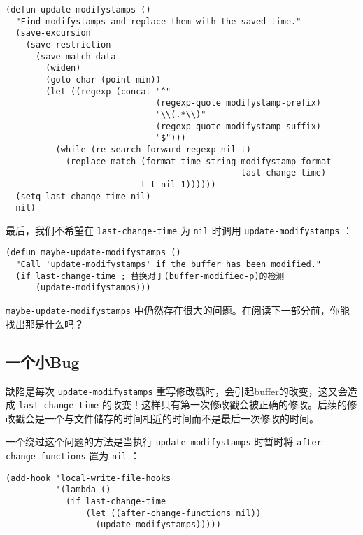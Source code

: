 \begin{verbatim}
(defun update-modifystamps ()
  "Find modifystamps and replace them with the saved time."
  (save-excursion
    (save-restriction
      (save-match-data
        (widen)
        (goto-char (point-min))
        (let ((regexp (concat "^"
                              (regexp-quote modifystamp-prefix)
                              "\\(.*\\)"
                              (regexp-quote modifystamp-suffix)
                              "$")))
          (while (re-search-forward regexp nil t)
            (replace-match (format-time-string modifystamp-format
                                               last-change-time)
                           t t nil 1))))))
  (setq last-change-time nil)
  nil)
\end{verbatim}

最后，我们不希望在 \texttt{last-change-time} 为 \texttt{nil} 时调用 \texttt{update-modifystamps} ：

\begin{verbatim}
(defun maybe-update-modifystamps ()
  "Call 'update-modifystamps' if the buffer has been modified."
  (if last-change-time ; 替换对于(buffer-modified-p)的检测
      (update-modifystamps)))
\end{verbatim}

\texttt{maybe-update-modifystamps} 中仍然存在很大的问题。在阅读下一部分前，你能找出那是什么吗？

\subsection{一个小Bug}
\label{section:04-A-Subtle-Bug}

缺陷是每次 \texttt{update-modifystamps} 重写修改戳时，会引起buffer的改变，这又会造成 \texttt{last-change-time} 的改变！这样只有第一次修改戳会被正确的修改。后续的修改戳会是一个与文件储存的时间相近的时间而不是最后一次修改的时间。

一个绕过这个问题的方法是当执行 \texttt{update-modifystamps} 时暂时将 \texttt{after-change-functions} 置为 \texttt{nil} ：

\begin{verbatim}
(add-hook 'local-write-file-hooks
          '(lambda ()
            (if last-change-time
                (let ((after-change-functions nil))
                  (update-modifystamps)))))
\end{verbatim}

